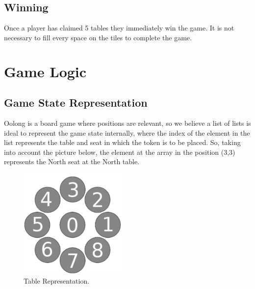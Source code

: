 \documentclass[a4paper]{article}
\begin{document}
\subsection{Winning}
Once a player has claimed 5 tables they immediately win the game. It is not necessary to
fill every space on the tiles to complete the game.



\newpage



\section{Game Logic}

\subsection{Game State Representation}
Oolong is a board game where positions are relevant, so we believe a list of lists is ideal
to represent the game state internally, where the index of the element in the list represents the
table and seat in which the token is to be placed. So, taking into account the picture below, the
element at the array in the position (3,3) represents the North seat at the North table.

\begin{figure}[H]
\centering
{}
  \includegraphics[width=\linewidth]{gameboard.png}
  \caption{Table Representation.}\label{fig:table_rep}
\endminipage\hfill
\end{figure}
\end{document}
